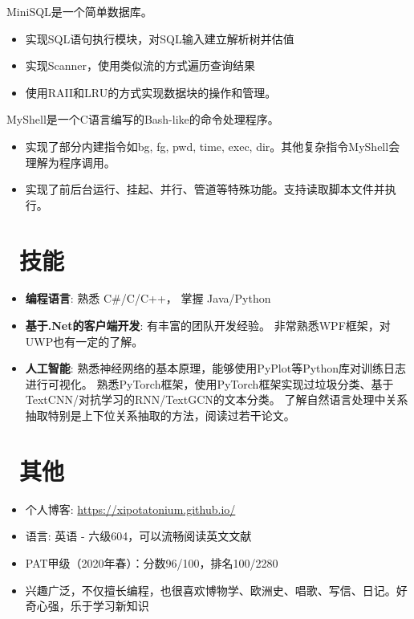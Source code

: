 \documentclass{resume}
\begin{document}
MiniSQL是一个简单数据库。
\begin{itemize}
  \item 实现SQL语句执行模块，对SQL输入建立解析树并估值
  \item 实现Scanner，使用类似流的方式遍历查询结果
  \item 使用RAII和LRU的方式实现数据块的操作和管理。
\end{itemize}

MyShell是一个C语言编写的Bash-like的命令处理程序。
\begin{itemize}
    \item 实现了部分内建指令如bg, fg, pwd, time, exec, dir。其他复杂指令MyShell会理解为程序调用。
    \item 实现了前后台运行、挂起、并行、管道等特殊功能。支持读取脚本文件并执行。
\end{itemize}

\section{\faCogs\ 技能}
\begin{itemize}[parsep=0.25ex]
    \item \textbf{编程语言}:
        熟悉 C\#/C/C++，
        掌握 Java/Python

    \item \textbf{基于.Net的客户端开发}:
        有丰富的团队开发经验。
        非常熟悉WPF框架，对UWP也有一定的了解。

    \item \textbf{人工智能}:
        熟悉神经网络的基本原理，能够使用PyPlot等Python库对训练日志进行可视化。
        熟悉PyTorch框架，使用PyTorch框架实现过垃圾分类、基于TextCNN/对抗学习的RNN/TextGCN的文本分类。
        了解自然语言处理中关系抽取特别是上下位关系抽取的方法，阅读过若干论文。

\end{itemize}


\section{\faInfo\ 其他}
\begin{itemize}[parsep=0.25ex]
  \item 个人博客: \url{https://xipotatonium.github.io/}
  \item 语言: 英语 - 六级604，可以流畅阅读英文文献
  \item PAT甲级（2020年春）：分数96/100，排名100/2280
  \item 兴趣广泛，不仅擅长编程，也很喜欢博物学、欧洲史、唱歌、写信、日记。好奇心强，乐于学习新知识
\end{itemize}
\end{document}
